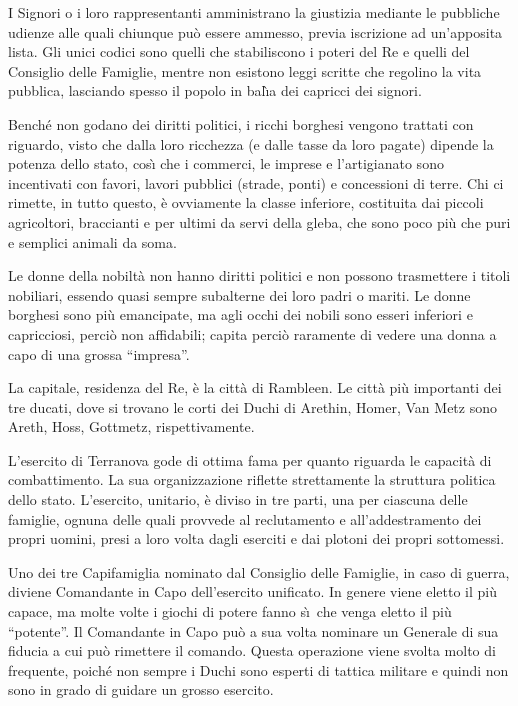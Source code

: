 I Signori o i loro rappresentanti amministrano la giustizia mediante
le pubbliche udienze alle quali chiunque pu\`o essere ammesso, previa
iscrizione ad un'apposita lista. Gli unici codici sono quelli che
stabiliscono i poteri del Re e quelli del Consiglio delle Famiglie,
mentre non esistono leggi scritte che regolino la vita pubblica,
lasciando spesso il popolo in bal\`{\i}a dei capricci dei signori.

Bench\'e non godano dei diritti politici, i ricchi borghesi vengono
trattati con riguardo, visto che dalla loro ricchezza (e dalle tasse
da loro pagate) dipende la potenza dello stato, cos\`{\i}  che i
commerci, le imprese e l'artigianato sono incentivati con favori,
lavori pubblici (strade, ponti) e concessioni di terre. Chi ci
rimette, in tutto questo, \`e ovviamente la classe inferiore,
costituita dai piccoli agricoltori, braccianti e per ultimi da servi
della gleba, che sono poco pi\`u che puri e semplici animali da soma.

Le donne della nobilt\`a non hanno diritti politici e non possono
trasmettere i titoli nobiliari, essendo quasi sempre subalterne dei
loro padri o mariti.  Le donne borghesi sono pi\`u emancipate, ma agli
occhi dei nobili sono esseri inferiori e capricciosi, perci\`o non
affidabili; capita perci\`o raramente di vedere una donna a capo di
una grossa ``impresa''.

La capitale, residenza del Re, \`e la citt\`a di Rambleen.  Le citt\`a
pi\`u importanti dei tre ducati, dove si trovano le corti dei Duchi di
Arethin, Homer, Van Metz sono A\-reth, Hoss, Gott\-metz,
rispettivamente.

\Esercito L'esercito di Terranova gode di ottima fama per quanto
riguarda le capacit\`a di combattimento. La sua organizzazione
riflette strettamente la struttura politica dello stato. L'esercito,
unitario, \`e diviso in tre parti, una per ciascuna delle famiglie,
ognuna delle quali provvede al reclutamento e all'addestramento dei
propri uomini, presi a loro volta dagli eserciti e dai plotoni dei
propri sottomessi. 

Uno dei tre Capifamiglia nominato dal Consiglio delle Famiglie, in
caso di guerra, diviene Comandante in Capo dell'esercito unificato. In
genere viene eletto il pi\`u capace, ma molte volte i giochi di potere
fanno s\`\i\  che venga eletto il pi\`u ``potente''. Il Comandante in
Capo pu\`o a sua volta nominare un Generale di sua fiducia a cui pu\`o
rimettere il comando. Questa operazione viene svolta molto di
frequente, poich\'e non sempre i Duchi sono esperti di tattica
militare e quindi non sono in grado di guidare un grosso esercito.

